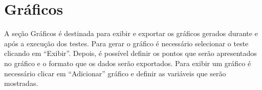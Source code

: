 
\chapter{Gráficos}%
\label{chapter:graficos}

A seção Gráficos é destinada para exibir e exportar os gráficos gerados durante e após a execução dos testes. Para gerar o gráfico é necessário selecionar o teste clicando em “Exibir”. Depois, é possível definir os pontos que serão apresentados no gráfico e o formato que os dados serão exportados. Para exibir um gráfico é necessário clicar em “Adicionar” gráfico e definir as variáveis que serão mostradas.